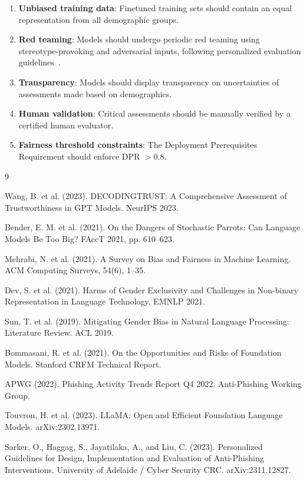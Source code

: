 \documentclass[conference]{IEEEtran}
\begin{document}
\begin{enumerate}
    \item \textbf{Unbiased training data}: Finetuned training sets should contain an equal representation from all demographic groups.
    \item \textbf{Red teaming}: Models should undergo periodic red teaming using stereotype-provoking and adversarial inputs, following personalized evaluation guidelines~\cite{sarker2023personalized}.
    \item \textbf{Transparency}: Models should display transparency on uncertainties of assessments made based on demographics.
    \item \textbf{Human validation}: Critical assessments should be manually verified by a certified human evaluator.
    \item \textbf{Fairness threshold constraints}: The Deployment Prerequisites Requirement should enforce DPR $> 0.8$.
\end{enumerate}
\begin{thebibliography}{9}

Wang, B. et al. (2023). DECODINGTRUST: A Comprehensive Assessment of Trustworthiness in GPT Models. NeurIPS 2023.

Bender, E. M. et al. (2021). On the Dangers of Stochastic Parrots: Can Language Models Be Too Big? FAccT 2021, pp. 610–623.

Mehrabi, N. et al. (2021). A Survey on Bias and Fairness in Machine Learning. ACM Computing Surveys, 54(6), 1–35.

Dev, S. et al. (2021). Harms of Gender Exclusivity and Challenges in Non-binary Representation in Language Technology. EMNLP 2021.

Sun, T. et al. (2019). Mitigating Gender Bias in Natural Language Processing: Literature Review. ACL 2019.

Bommasani, R. et al. (2021). On the Opportunities and Risks of Foundation Models. Stanford CRFM Technical Report.

APWG (2022). Phishing Activity Trends Report Q4 2022. Anti-Phishing Working Group.

Touvron, H. et al. (2023). LLaMA: Open and Efficient Foundation Language Models. arXiv:2302.13971.

Sarker, O., Haggag, S., Jayatilaka, A., and Liu, C. (2023). Personalized Guidelines for Design, Implementation and Evaluation of Anti-Phishing Interventions. University of Adelaide / Cyber Security CRC. arXiv:2311.12827.

\end{thebibliography}

\balance
\end{document}
